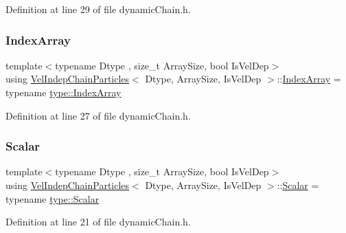 Definition at line 29 of file dynamic\+Chain.\+h.

\mbox{\label{class_vel_indep_chain_particles_a691749351fb710d16619ef6cc43bb1e6}} 
\subsubsection{\texorpdfstring{Index\+Array}{IndexArray}}
{\footnotesize\ttfamily template$<$typename Dtype , size\+\_\+t Array\+Size, bool Is\+Vel\+Dep$>$ \\
using \mbox{\hyperlink{class_vel_indep_chain_particles}{Vel\+Indep\+Chain\+Particles}}$<$ Dtype, Array\+Size, Is\+Vel\+Dep $>$\+::\mbox{\hyperlink{class_vel_indep_chain_particles_a691749351fb710d16619ef6cc43bb1e6}{Index\+Array}} =  typename \mbox{\hyperlink{struct_space_h_1_1_proto_type_a276a37c81faf08681b57e8082f3f6c1b}{type\+::\+Index\+Array}}}



Definition at line 27 of file dynamic\+Chain.\+h.

\mbox{\label{class_vel_indep_chain_particles_a0a945beff437274ce5ae8f7d182da8fe}} 
\subsubsection{\texorpdfstring{Scalar}{Scalar}}
{\footnotesize\ttfamily template$<$typename Dtype , size\+\_\+t Array\+Size, bool Is\+Vel\+Dep$>$ \\
using \mbox{\hyperlink{class_vel_indep_chain_particles}{Vel\+Indep\+Chain\+Particles}}$<$ Dtype, Array\+Size, Is\+Vel\+Dep $>$\+::\mbox{\hyperlink{class_vel_indep_particles_a5d275b22f0d759f360ddd80e78f4b466}{Scalar}} =  typename \mbox{\hyperlink{struct_space_h_1_1_proto_type_af3c8245d83d9db64749882920de5c274}{type\+::\+Scalar}}}



Definition at line 21 of file dynamic\+Chain.\+h.

\mbox{\label{class_vel_indep_chain_particles_aad309dbb10b07c76d1453f0f659cbde2}} 
